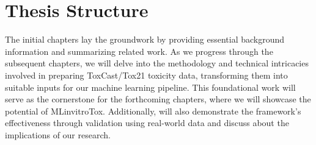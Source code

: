 \section{Thesis Structure}

The initial chapters lay the groundwork by providing essential background information and summarizing related work. As we progress through the subsequent chapters, we will delve into the methodology and technical intricacies involved in preparing ToxCast/Tox21 toxicity data, transforming them into suitable inputs for our machine learning pipeline. This foundational work will serve as the cornerstone for the forthcoming chapters, where we will showcase the potential of MLinvitroTox. Additionally, will also demonstrate the framework's effectiveness through validation using real-world data and discuss about the implications of our research.

